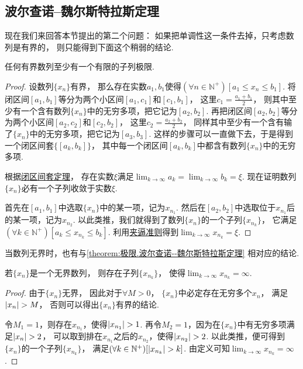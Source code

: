 \subsection{波尔查诺--魏尔斯特拉斯定理}
现在我们来回答本节提出的第二个问题：
如果把单调性这一条件去掉，只考虑数列是有界的，
则只能得到下面这个稍弱的结论.
\begin{theorem}\label{theorem:极限.波尔查诺--魏尔斯特拉斯定理}
任何有界数列至少有一个有限的子列极限.
\begin{proof}
设数列\(\{x_n\}\)有界，
那么存在实数\(a_1,b_1\)使得\((\forall n\in\mathbb{N}^+)[a_1 \leq x_n \leq b_1]\).
将闭区间\([a_1,b_1]\)等分为两个小区间\([a_1,c_1]\)和\([c_1,b_1]\)，
这里\(c_1=\frac{a_1+b_1}2\)，
则其中至少有一个含有数列\(\{x_n\}\)中的无穷多项，把它记为\([a_2,b_2]\).
再把闭区间\([a_2,b_2]\)等分为两个小区间\([a_2,c_2]\)和\([c_2,b_2]\)，
这里\(c_2=\frac{a_2+b_2}2\)，
同样其中至少有一个含有输了\(\{x_n\}\)中的无穷多项，把它记为\([a_3,b_3]\).
这样的步骤可以一直做下去，于是得到一个闭区间套\(\{[a_k,b_k]\}\)，
其中每一个闭区间\([a_k,b_k]\)中都含有数列\(\{x_n\}\)中的无穷多项.

根据\hyperref[definition:极限.闭区间套定理]{闭区间套定理}，
存在实数\(\xi\)满足\(\lim_{k\to\infty} a_k = \lim_{k\to\infty} b_k = \xi\).
现在证明数列\(\{x_n\}\)必有一个子列收敛于实数\(\xi\).

首先在\([a_1,b_1]\)中选取\(\{x_n\}\)中的某一项，记为\(x_{n_1}\).
然后在\([a_2,b_2]\)中选取位于\(x_{n_1}\)后的某一项，记为\(x_{n_2}\).
以此类推，我们就得到了数列\(\{x_n\}\)的一个子列\(\{x_{n_k}\}\)，
它满足\((\forall k\in\mathbb{N}^+)[a_k \leq x_{n_k} \leq b_k]\).
利用\hyperref[theorem:数列极限.夹逼准则]{夹逼准则}得到\(\lim_{k\to\infty} x_{n_k} = \xi\).
\end{proof}
\end{theorem}

当数列无界时，也有与\cref{theorem:极限.波尔查诺--魏尔斯特拉斯定理} 相对应的结论.
\begin{theorem}
若\(\{x_n\}\)是一个无界数列，
则存在子列\(\{x_{n_k}\}\)，
使得\(\lim_{k\to\infty} x_{n_k} = \infty\).
\begin{proof}
由于\(\{x_n\}\)无界，
因此对于\(\forall M>0\)，
\(\{x_n\}\)中必定存在无穷多个\(x_n\)，
满足\(\abs{x_n}>M\)，
否则可以得出\(\{x_n\}\)有界的结论.

令\(M_1=1\)，则存在\(x_{n_1}\)，使得\(\abs{x_{n_1}}>1\).
再令\(M_2=1\)，因为在\(\{x_n\}\)中有无穷多项满足\(\abs{x_n}>2\)，
可以取到排在\(x_{n_1}\)之后的\(x_{n_2}\)，使得\(\abs{x_{n_2}}>2\).
以此类推，便可得到\(\{x_n\}\)的一个子列\(\{x_{n_k}\}\)，
满足\((\forall k\in\mathbb{N}^+)[\abs{x_{n_k}}>k]\).
由定义可知\(\lim_{k\to\infty} x_{n_k} = \infty\).
\end{proof}
\end{theorem}

